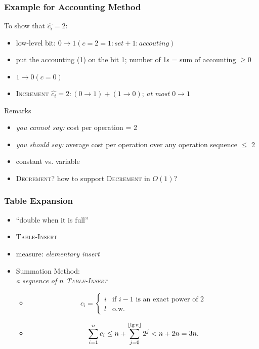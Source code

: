 \documentclass{beamer}
\DeclarePairedDelimiter\floor{\lfloor}{\rfloor}
\begin{document}
\begin{frame}
  \frametitle{Example for Accounting Method}
  
  \begin{example}
    To show that $\hat{c_i} = 2$:
    \begin{itemize}
      \item low-level bit: $0 \to 1 (c=2 = 1:set+1:accouting)$
      \item put the accounting (1) on the bit 1; number of 1s = sum of
      accounting $\geq 0$
      \item $1 \to 0 (c=0)$
      \item \textsc{Increment} $\hat{c_i} = 2: (0 \to 1) + (1 \to 0)$; \emph{at
      most $0 \to 1$}
    \end{itemize}
  \end{example}
  
  \begin{block}{Remarks}
    \begin{itemize}
      \item \emph{you cannot say:} cost per operation = 2
      \item \emph{you should say:} average cost per operation over any operation
      sequence $\leq$ 2
      \item constant vs. variable
      \item \textsc{Decrement}? how to support \textsc{Decrement} in $O(1)$?
    \end{itemize}
  \end{block}
\end{frame}

\begin{frame}
  \frametitle{Table Expansion}
  
  \begin{example}
    \begin{itemize}
      \item ``double when it is full''
      \item \textsc{Table-Insert}
      \item measure: \emph{elementary insert}
    \end{itemize}
    \begin{itemize}
      \item Summation Method: \\
        \emph{a sequence of $n$ \textsc{Table-Insert}}
        \begin{itemize}
          \item \begin{displaymath}
					c_i = \left\{ \begin{array}{ll}
					i & \textrm{if $i-1$ is an exact power of 2}\\
					l & \textrm{o.w.}
					\end{array} \right.
				\end{displaymath}
		  \item \[
				  \sum_{i=1}^{n} c_i \leq n + \sum_{j=0}^{\floor{\lg n}} 2^j < n + 2n = 3n.
		  		\]
        \end{itemize}
    \end{itemize}
  \end{example}
\end{frame}
\end{document}
